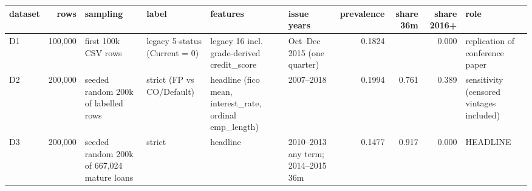 \begin{tabular}{lrllp{5.2cm}lrrrl}
\toprule
dataset & rows & sampling & label & features & issue years & prevalence & share 36m & share 2016+ & role \\
\midrule
D1 & 100,000 & first 100k CSV rows & legacy 5-status (Current = 0) & legacy 16 incl. grade-derived credit\_score & Oct--Dec 2015 (one quarter) & 0.1824 &  & 0.000 & replication of conference paper \\
D2 & 200,000 & seeded random 200k of labelled rows & strict (FP vs CO/Default) & headline (fico mean, interest\_rate, ordinal emp\_length) & 2007--2018 & 0.1994 & 0.761 & 0.389 & sensitivity (censored vintages included) \\
D3 & 200,000 & seeded random 200k of 667,024 mature loans & strict & headline & 2010--2013 any term; 2014--2015 36m & 0.1477 & 0.917 & 0.000 & HEADLINE \\
\bottomrule
\end{tabular}
